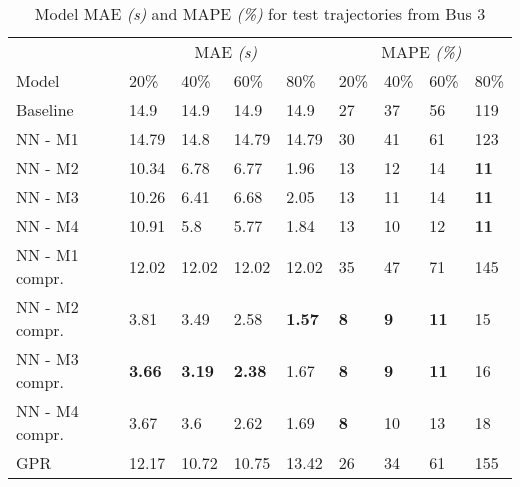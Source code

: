 \begin{table}[H]
  \centering
  \caption{Model MAE \textit{(s)} and MAPE \textit{(\%)} for test trajectories from Bus 3}
  \label{tbl:models-mae-and-mape-203}
  \begin{tabular}{l | l | l | l | l || l | l | l | l }
    & \multicolumn{4}{c}{MAE \textit{(s)}} & \multicolumn{4}{c}{MAPE \textit{(\%)}} \\
    Model      & 20\% & 40\% & 60\% & 80\% & 20\% & 40\% & 60\% & 80\% \\
    \hline
    Baseline & 14.9 & 14.9 & 14.9 & 14.9  & 27 & 37 & 56 & 119 \\
    NN - M1        & 14.79& 14.8& 14.79& 14.79& 30& 41& 61& 123 \\
    NN - M2        & 10.34& 6.78& 6.77& 1.96& 13& 12& 14& \textbf{11} \\
    NN - M3       & 10.26& 6.41& 6.68& 2.05& 13& 11& 14& \textbf{11}\\
    NN - M4        & 10.91& 5.8& 5.77& 1.84& 13& 10& 12& \textbf{11} \\
    NN - M1 compr.       & 12.02& 12.02& 12.02& 12.02& 35& 47& 71& 145 \\
    NN - M2 compr.       & 3.81& 3.49& 2.58& \textbf{1.57}& \textbf{8}& \textbf{9}& \textbf{11}& 15 \\
    NN - M3 compr.       & \textbf{3.66}& \textbf{3.19}& \textbf{2.38}& 1.67& \textbf{8}& \textbf{9}& \textbf{11}& 16 \\
    NN - M4 compr.       & 3.67& 3.6& 2.62& 1.69& \textbf{8} & 10& 13& 18 \\
    GPR        &  12.17 & 10.72 & 10.75 & 13.42 & 26 &  34 & 61 &  155  \\
  \end{tabular}
\end{table}

